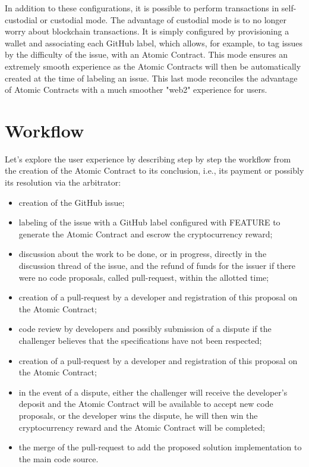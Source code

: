 \documentclass[
	a4paper, %
	10pt, %
	unnumberedsections, %
	twoside, %
]{LTJournalArticle}
\begin{document}
In addition to these configurations, it is possible to perform transactions in self-custodial or custodial mode. The advantage of custodial mode is to no longer worry about blockchain transactions. It is simply configured by provisioning a wallet and associating each GitHub label, which allows, for example, to tag issues by the difficulty of the issue, with an Atomic Contract. This mode ensures an extremely smooth experience as the Atomic Contracts will then be automatically created at the time of labeling an issue. This last mode reconciles the advantage of Atomic Contracts with a much smoother "web2" experience for users.



\section{Workflow}

Let's explore the user experience by describing step by step the workflow from the creation of the Atomic Contract to its conclusion, i.e., its payment or possibly its resolution via the arbitrator:

\begin{itemize}
\item
  creation of the GitHub issue;
\item
  labeling of the issue with a GitHub label configured with FEATURE to generate the Atomic Contract and escrow the cryptocurrency reward;
\item
  discussion about the work to be done, or in progress, directly in the discussion thread of the issue, and the refund of funds for the issuer if there were no code proposals, called pull-request, within the allotted time;
\item
  creation of a pull-request by a developer and registration of this proposal on the Atomic Contract;
\item
  code review by developers and possibly submission of a dispute if the challenger believes that the specifications have not been respected;
\item
  creation of a pull-request by a developer and registration of this proposal on the Atomic Contract;
\item
  in the event of a dispute, either the challenger will receive the developer's deposit and the Atomic Contract will be available to accept new code proposals, or the developer wins the dispute, he will then win the cryptocurrency reward and the Atomic Contract will be completed;
\item
  the merge of the pull-request to add the proposed solution implementation to the main code source.
\end{itemize}
\end{document}
